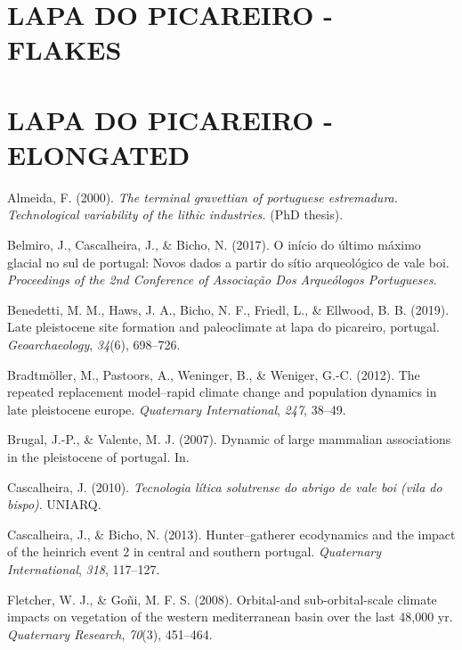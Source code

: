 \documentclass[12pt,twoside]{reedthesis}
\begin{document}
\hypertarget{lapa-do-picareiro---flakes}{%
\section{LAPA DO PICAREIRO - FLAKES}\label{lapa-do-picareiro---flakes}}

\hypertarget{lapa-do-picareiro---elongated}{%
\section{LAPA DO PICAREIRO - ELONGATED}\label{lapa-do-picareiro---elongated}}

\hypertarget{refs}{}
\leavevmode\hypertarget{ref-almeida2000}{}%
Almeida, F. (2000). \emph{The terminal gravettian of portuguese estremadura. Technological variability of the lithic industries.} (PhD thesis).

\leavevmode\hypertarget{ref-belmiro2017}{}%
Belmiro, J., Cascalheira, J., \& Bicho, N. (2017). O início do último máximo glacial no sul de portugal: Novos dados a partir do sítio arqueológico de vale boi. \emph{Proceedings of the 2nd Conference of Associação Dos Arqueólogos Portugueses}.

\leavevmode\hypertarget{ref-benedettietal2019}{}%
Benedetti, M. M., Haws, J. A., Bicho, N. F., Friedl, L., \& Ellwood, B. B. (2019). Late pleistocene site formation and paleoclimate at lapa do picareiro, portugal. \emph{Geoarchaeology}, \emph{34}(6), 698--726.

\leavevmode\hypertarget{ref-bradtmoller2012}{}%
Bradtmöller, M., Pastoors, A., Weninger, B., \& Weniger, G.-C. (2012). The repeated replacement model--rapid climate change and population dynamics in late pleistocene europe. \emph{Quaternary International}, \emph{247}, 38--49.

\leavevmode\hypertarget{ref-brugal2007}{}%
Brugal, J.-P., \& Valente, M. J. (2007). Dynamic of large mammalian associations in the pleistocene of portugal. In.

\leavevmode\hypertarget{ref-cascalheira2010}{}%
Cascalheira, J. (2010). \emph{Tecnologia lítica solutrense do abrigo de vale boi (vila do bispo)}. UNIARQ.

\leavevmode\hypertarget{ref-cascalheiraandbicho2013}{}%
Cascalheira, J., \& Bicho, N. (2013). Hunter--gatherer ecodynamics and the impact of the heinrich event 2 in central and southern portugal. \emph{Quaternary International}, \emph{318}, 117--127.

\leavevmode\hypertarget{ref-fletcher2008}{}%
Fletcher, W. J., \& Goñi, M. F. S. (2008). Orbital-and sub-orbital-scale climate impacts on vegetation of the western mediterranean basin over the last 48,000 yr. \emph{Quaternary Research}, \emph{70}(3), 451--464.
\end{document}
